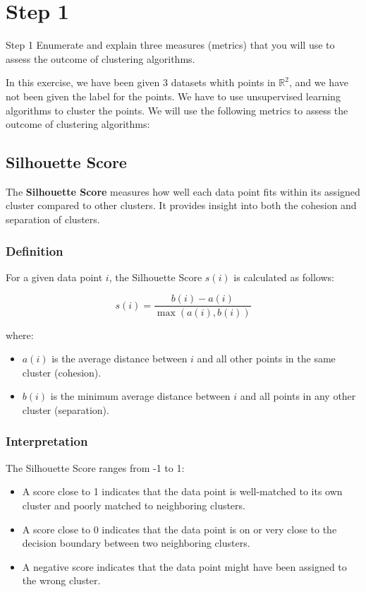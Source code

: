 \section{Step 1}

\begin{custombox}[label={box:Q1}]{Step 1}
	Enumerate and explain three measures (metrics) that you will use to assess the outcome of clustering algorithms.
\end{custombox}


In this exercise, we have been given 3 datasets whith points in $\mathbb{R}^2$, and we have not been given the label for the points. We have to use unsupervised learning algorithms to cluster the points. We will use the following metrics to assess the outcome of clustering algorithms:

\subsection*{Silhouette Score}
The \textbf{Silhouette Score} measures how well each data point fits within its assigned cluster compared to other clusters. It provides insight into both the cohesion and separation of clusters.

\subsubsection*{Definition}
For a given data point \(i\), the Silhouette Score \(s(i)\) is calculated as follows:

\[
s(i) = \frac{b(i) - a(i)}{\max(a(i), b(i))}
\]

where:
\begin{itemize}
    \item \(a(i)\) is the average distance between \(i\) and all other points in the same cluster (cohesion).
    \item \(b(i)\) is the minimum average distance between \(i\) and all points in any other cluster (separation).
\end{itemize}

\subsubsection*{Interpretation}
The Silhouette Score ranges from -1 to 1:
\begin{itemize}
    \item A score close to 1 indicates that the data point is well-matched to its own cluster and poorly matched to neighboring clusters.
    \item A score close to 0 indicates that the data point is on or very close to the decision boundary between two neighboring clusters.
    \item A negative score indicates that the data point might have been assigned to the wrong cluster.
\end{itemize}

